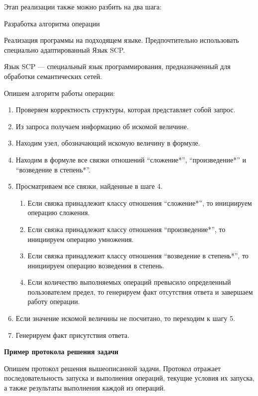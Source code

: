 Этап реализации также можно разбить на два шага:

\begin{textitemize}
	\item Разработка алгоритма операции
	\item Реализация программы на подходящем языке. Предпочтительно использовать специально адаптированный Язык SCP.
\end{textitemize}

Язык SCP --- специальный язык программирования, предназначенный для обработки семантических сетей.

Опишем алгоритм работы операции:

\begin{enumerate}
	\item
	Проверяем корректность структуры, которая представляет собой запрос.
	\item
	Из запроса получаем информацию об искомой величине.
	\item
	Находим узел, обозначающий искомую величину в формуле.
	\item
	Находим в формуле все связки отношений ``сложение*'', ``произведение*'' и ``возведение в степень*''.
	\item
	Просматриваем все связки, найденные в шаге 4.
	
	\begin{enumerate}
		\def\labelenumii{\arabic{enumii}.}
		\item
		Если связка принадлежит классу отношения ``сложение*'', то инициируем операцию сложения.
		\item
		Если связка принадлежит классу отношения ``произведение*'', то инициируем операцию умножения.
		\item
		Если связка принадлежит классу отношения ``возведение в степень*'', то инициируем операцию возведения в степень.
		\item
		Если количество выполняемых операций превысило определенный пользователем предел, то генерируем факт отсутствия ответа и завершаем работу операции.
	\end{enumerate}
	\item
	Если значение искомой величины не посчитано, то переходим к шагу 5.
	\item
	Генерируем факт присутствия ответа.
\end{enumerate}

\textbf{Пример протокола решения задачи}

Опишем протокол решения вышеописанной задачи. Протокол отражает последовательность запуска и выполнения операций, текущие условия их запуска, а также результаты выполнения каждой из операций.

